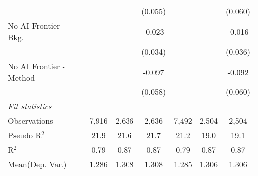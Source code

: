 \begin{tabular}{lcccccc}
                           &              &         & (0.055)      &              &         & (0.060)\\   
   No AI Frontier - Bkg.   &              &         & -0.023       &              &         & -0.016\\   
                           &              &         & (0.034)      &              &         & (0.036)\\   
   No AI Frontier - Method &              &         & -0.097       &              &         & -0.092\\   
                           &              &         & (0.058)      &              &         & (0.060)\\   
   \midrule
   \emph{Fit statistics}\\
   Observations            & 7,916        & 2,636   & 2,636        & 7,492        & 2,504   & 2,504\\  
   Pseudo R$^2$            & 21.9         & 21.6    & 21.7         & 21.2         & 19.0    & 19.1\\  
   R$^2$                   & 0.79         & 0.87    & 0.87         & 0.79         & 0.87    & 0.87\\  
Mean(Dep. Var.) & 1.286 & 1.308 & 1.308 & 1.285 & 1.306 & 1.306 \\
   

\end{tabular}
